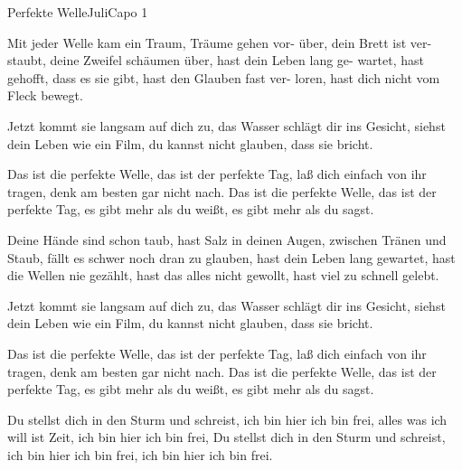 \begin{song}{Perfekte Welle}{Juli}{Capo 1}

Mit jeder Welle kam ein
Traum, Träume gehen vor-  über, dein Brett ist ver-
staubt, deine Zweifel schäumen     über, hast dein Leben lang ge-
wartet, hast gehofft, dass es sie gibt, hast den Glauben fast ver-
loren, hast dich nicht vom Fleck bewegt.

Jetzt kommt sie langsam auf dich
zu, das Wasser schlägt dir ins Gesicht, siehst dein Leben wie ein
Film, du kannst nicht glauben, dass sie bricht.

Das ist die perfekte
Welle, das ist der perfekte Tag, laß dich einfach von ihr
tragen, denk am besten gar nicht nach.
Das ist die perfekte Welle, das ist der perfekte Tag, es gibt mehr als du
weißt, es gibt mehr als du sagst.

Deine Hände sind schon taub, hast Salz in deinen Augen,
zwischen Tränen und Staub, fällt es schwer noch dran zu glauben,
hast dein Leben lang gewartet, hast die Wellen nie gezählt,
hast das alles nicht gewollt, hast viel zu schnell gelebt.

Jetzt kommt sie langsam auf dich
zu, das Wasser schlägt dir ins Gesicht, siehst dein Leben wie ein
Film, du kannst nicht glauben, dass sie bricht.

\newpage
{}
Das ist die perfekte
Welle, das ist der perfekte Tag, laß dich einfach von ihr
tragen, denk am besten gar nicht nach.
Das ist die perfekte Welle, das ist der perfekte Tag, es gibt mehr als du
weißt, es gibt mehr als du sagst.

Du stellst dich in den Sturm und schreist, ich bin hier ich bin frei,
alles was ich will ist Zeit, ich bin hier ich bin frei,
Du stellst dich in den Sturm und schreist, ich bin hier ich bin frei,
ich bin hier ich bin frei.


\end{song}
